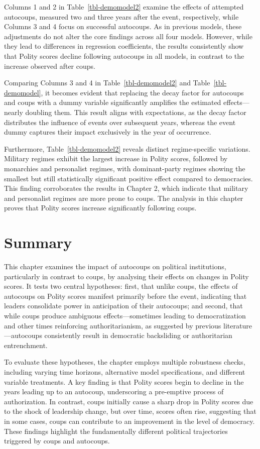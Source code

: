 \documentclass[
  12pt,
]{report}
\begin{document}
Columns 1 and 2 in Table~\ref{tbl-demomodel2} examine the effects of
attempted autocoups, measured two and three years after the event,
respectively, while Columns 3 and 4 focus on successful autocoups. As in
previous models, these adjustments do not alter the core findings across
all four models. However, while they lead to differences in regression
coefficients, the results consistently show that Polity scores decline
following autocoups in all models, in contrast to the increase observed
after coups.

Comparing Columns 3 and 4 in Table~\ref{tbl-demomodel2} and
Table~\ref{tbl-demomodel}, it becomes evident that replacing the decay
factor for autocoups and coups with a dummy variable significantly
amplifies the estimated effects---nearly doubling them. This result
aligns with expectations, as the decay factor distributes the influence
of events over subsequent years, whereas the event dummy captures their
impact exclusively in the year of occurrence.

Furthermore, Table~\ref{tbl-demomodel2} reveals distinct regime-specific
variations. Military regimes exhibit the largest increase in Polity
scores, followed by monarchies and personalist regimes, with
dominant-party regimes showing the smallest but still statistically
significant positive effect compared to democracies. This finding
corroborates the results in Chapter 2, which indicate that military and
personalist regimes are more prone to coups. The analysis in this
chapter proves that Polity scores increase significantly following
coups.

\section{Summary}\label{summary-3}

This chapter examines the impact of autocoups on political institutions,
particularly in contrast to coups, by analysing their effects on changes
in Polity scores. It tests two central hypotheses: first, that unlike
coups, the effects of autocoups on Polity scores manifest primarily
before the event, indicating that leaders consolidate power in
anticipation of their autocoups; and second, that while coups produce
ambiguous effects---sometimes leading to democratization and other times
reinforcing authoritarianism, as suggested by previous
literature---autocoups consistently result in democratic backsliding or
authoritarian entrenchment.

To evaluate these hypotheses, the chapter employs multiple robustness
checks, including varying time horizons, alternative model
specifications, and different variable treatments. A key finding is that
Polity scores begin to decline in the years leading up to an autocoup,
underscoring a pre-emptive process of authorization. In contrast, coups
initially cause a sharp drop in Polity scores due to the shock of
leadership change, but over time, scores often rise, suggesting that in
some cases, coups can contribute to an improvement in the level of
democracy. These findings highlight the fundamentally different
political trajectories triggered by coups and autocoups.
\end{document}
